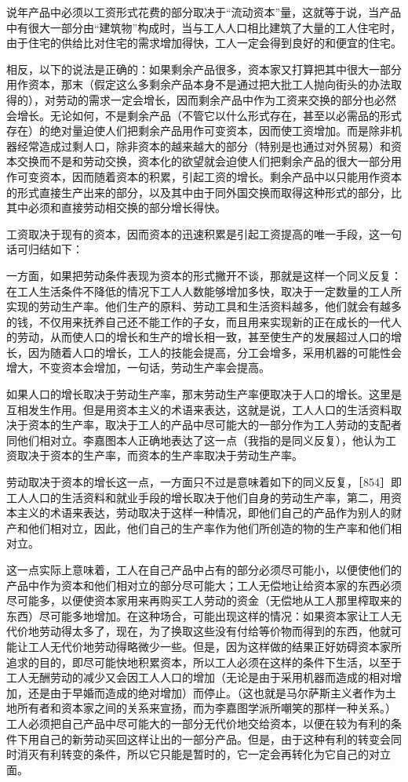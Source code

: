 说年产品中必须以工资形式花费的部分取决于“流动资本”量，这就等于说，当产品中有很大一部分由“建筑物”构成时，当与工人人口相比建筑了大量的工人住宅时，由于住宅的供给比对住宅的需求增加得快，工人一定会得到良好的和便宜的住宅。

相反，以下的说法是正确的：如果剩余产品很多，资本家又打算把其中很大一部分用作资本，那末（假定这么多剩余产品本身不是通过把大批工人抛向街头的办法取得的），对劳动的需求一定会增长，因而剩余产品中作为工资来交换的部分也必然会增长。无论如何，不是剩余产品（不管它以什么形式存在，甚至以必需品的形式存在）的绝对量迫使人们把剩余产品用作可变资本，因而使工资增加。而是除非机器经常造成过剩人口，除非资本的越来越大的部分（特别是也通过对外贸易）和资本交换而不是和劳动交换，资本化的欲望就会迫使人们把剩余产品的很大一部分用作可变资本，因而随着资本的积累，引起工资的增长。剩余产品中以只能用作资本的形式直接生产出来的部分，以及其中由于同外国交换而取得这种形式的部分，比其中必须和直接劳动相交换的部分增长得快。

工资取决于现有的资本，因而资本的迅速积累是引起工资提高的唯一手段，这一句话可归结如下：

一方面，如果把劳动条件表现为资本的形式撇开不谈，那就是这样一个同义反复：在工人生活条件不降低的情况下工人人数能够增加多快，取决于一定数量的工人所实现的劳动生产率。他们生产的原料、劳动工具和生活资料越多，他们就会有越多的钱，不仅用来抚养自己还不能工作的子女，而且用来实现新的正在成长的一代人的劳动，从而使人口的增长和生产的增长相一致，甚至使生产的发展超过人口的增长，因为随着人口的增长，工人的技能会提高，分工会增多，采用机器的可能性会增大，不变资本会增加，一句话，劳动生产率会提高。

如果人口的增长取决于劳动生产率，那末劳动生产率便取决于人口的增长。这里是互相发生作用。但是用资本主义的术语来表达，这就是说，工人人口的生活资料取决于资本的生产率，取决于工人的产品中尽可能大的一部分作为工人劳动的支配者同他们相对立。李嘉图本人正确地表达了这一点（我指的是同义反复），他认为工资取决于资本的生产率，而资本的生产率取决于劳动生产率。

劳动取决于资本的增长这一点，一方面只不过是意味着如下的同义反复，［854］即工人人口的生活资料和就业手段的增长取决于他们自身的劳动生产率，第二，用资本主义的术语来表达，劳动取决于这样一种情况，即他们自己的产品作为别人的财产和他们相对立，因此，他们自己的生产率作为他们所创造的物的生产率和他们相对立。

这一点实际上意味着，工人在自己产品中占有的部分必须尽可能小，以便使他们的产品中作为资本和他们相对立的部分尽可能大；工人无偿地让给资本家的东西必须尽可能多，以便使资本家用来再购买工人劳动的资金（无偿地从工人那里榨取来的东西）尽可能多地增加。在这种场合，可能出现这样的情况：如果资本家让工人无代价地劳动得太多了，现在，为了换取这些没有付给等价物而得到的东西，他就可能让工人无代价地劳动得略微少一些。但是，因为这样做的结果正好妨碍资本家所追求的目的，即尽可能快地积累资本，所以工人必须在这样的条件下生活，以至于工人无酬劳动的减少又会因工人人口的增加（无论是由于采用机器而造成的相对增加，还是由于早婚而造成的绝对增加）而停止。（这也就是马尔萨斯主义者作为土地所有者和资本家之间的关系来宣扬，而为李嘉图学派所嘲笑的那样一种关系。）工人必须把自己产品中尽可能大的一部分无代价地交给资本，以便在较为有利的条件下用自己的新劳动买回这样让出的一部分产品。但是，由于这种有利的转变会同时消灭有利转变的条件，所以它只能是暂时的，它一定会再转化为它自己的对立面。


